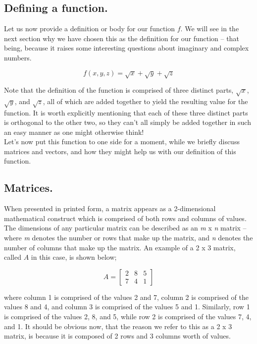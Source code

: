 \documentclass{article}
\begin{document}
\subsection{Defining a function.}

Let us now provide a definition or body for our function \begin{math} f \end{math}. We will see in the next section
why we have chosen this as the definition for our function -- that being, because it raises some interesting questions
about imaginary and complex numbers.

\begin{equation}
  f(x,y,z) = \sqrt{x} + \sqrt{y} + \sqrt{z}
\end{equation}

Note that the definition of the function is comprised of three distinct parts, $\sqrt{x}$, $\sqrt{y}$, and
$\sqrt{z}$, all of which are added together to yield the resulting value for the function. It is worth explicitly
mentioning that each of these three distinct parts is orthogonal to the other two, so they can't all simply be 
added together in such an easy manner as one might otherwise think!\\

Let's now put this function to one side for a moment, while we briefly discuss matrices and vectors, and how they might
help us with our definition of this function.


\subsection{Matrices.}

When presented in printed form, a matrix appears as a 2-dimensional mathematical construct
which is comprised of both rows and columns of values. The dimensions of any particular matrix can be described
as an \textit{m} x \textit{n} matrix -- where \textit{m} denotes the number or rows that make up the matrix, and
\textit{n} denotes the number of columns that make up the matrix. An example of a 2 x 3 
matrix, called $A$ in this case, is shown below;

\begin{equation*}
A = 
\begin{bmatrix}
2 & 8 & 5\\
7 & 4 & 1
\end{bmatrix}
\end{equation*}

where column 1 is comprised of the values 2 and 7, column 2 is comprised of the values 8 and 4, and column 3 is
comprised of the values 5 and 1. Similarly, row 1 is comprised of the values 2, 8, and 5, while row 2 is comprised
of the values 7, 4, and 1. It should be obvious now, that the reason we refer to this as a 2 x 3 matrix, is because
it is composed of 2 rows and 3 columns worth of values.\\
\end{document}
